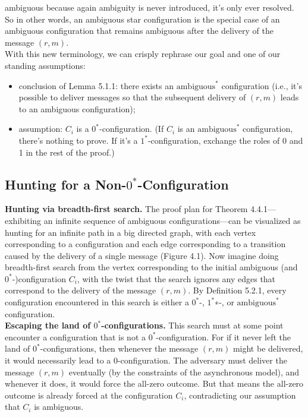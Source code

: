 ambiguous because again ambiguity is
never introduced, it's only ever
resolved.
So in other words, an ambiguous star
configuration is the special case of
an ambiguous configuration that remains
ambiguous after the delivery of the
message $(r,m)$.\\
With this new terminology, we can crisply rephrase our goal and one of our standing assumptions:
\begin{itemize}
    \item conclusion of Lemma 5.1.1: there exists an $\text{ambiguous}^*$ configuration (i.e., it’s possible to deliver messages so that the subsequent delivery of $(r, m)$ leads to an ambiguous configuration);
    \item assumption: $C_i$ is a $0^*$-configuration. (If $C_i$ is an $\text{ambiguous}^*$ configuration, there’s nothing to prove. If it’s a $1^*$-configuration, exchange the roles of 0 and 1 in the rest of the proof.)
\end{itemize}

\subsection{Hunting for a Non-$0^*$-Configuration}
\noindent
\textbf{Hunting via breadth-first search.} The proof plan for Theorem 4.4.1—exhibiting an infinite sequence of ambiguous configurations—can be visualized
as hunting for an infinite path in a big directed graph, with each vertex corresponding to a
configuration and each edge corresponding to a transition caused by the delivery of a single
message (Figure 4.1). Now imagine doing breadth-first search from the vertex corresponding
to the initial ambiguous (and $0^*$-)configuration $C_i$, with the twist that the search ignores
any edges that correspond to the delivery of the message $(r, m)$. By Definition 5.2.1, every
configuration encountered in this search is either a $0^*$-, $1^*$∗-, or $\text{ambiguous}^*$ configuration.\\

\noindent
\textbf{Escaping the land of $0^*$-configurations.} This search must at some point encounter a
configuration that is not a $0^*$-configuration. For if it never left the land of $0^*$-configurations,
then whenever the message $(r, m)$ might be delivered, it would necessarily lead to a 0-configuration. The adversary must deliver the message $(r, m)$ eventually (by the constraints
of the asynchronous model), and whenever it does, it would force the all-zero outcome. But
that means the all-zero outcome is already forced at the configuration $C_i$, contradicting our
assumption that $C_i$ is ambiguous.\\

